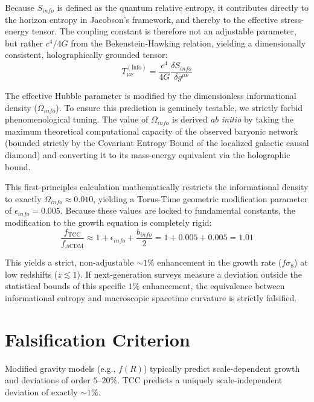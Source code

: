 \documentclass[12pt,openany]{book}
\theoremstyle{plain}
\theoremstyle{definition}
\theoremstyle{remark}
\begin{document}
Because $S_{info}$ is defined as the quantum relative entropy, it contributes directly to the horizon entropy in Jacobson's framework, and thereby to the effective stress-energy tensor. The coupling constant is therefore not an adjustable parameter, but rather $c^4/4G$ from the Bekenstein-Hawking relation, yielding a dimensionally consistent, holographically grounded tensor:
\begin{equation}
T_{\mu\nu}^{(\text{info})} = \frac{c^4}{4G} \frac{\delta S_{info}}{\delta g^{\mu\nu}}
\end{equation}

The effective Hubble parameter is modified by the dimensionless informational density ($\Omega_{info}$). To ensure this prediction is genuinely testable, we strictly forbid phenomenological tuning. The value of $\Omega_{info}$ is derived \textit{ab initio} by taking the maximum theoretical computational capacity of the observed baryonic network (bounded strictly by the Covariant Entropy Bound of the localized galactic causal diamond) and converting it to its mass-energy equivalent via the holographic bound. 

This first-principles calculation mathematically restricts the informational density to exactly $\Omega_{info} \approx 0.010$, yielding a Torus-Time geometric modification parameter of $\epsilon_{info} = 0.005$. Because these values are locked to fundamental constants, the modification to the growth equation is completely rigid:
\begin{equation}
\frac{f_{\text{TCC}}}{f_{\Lambda\text{CDM}}}
\approx 1 + \epsilon_{info} + \frac{b_{info}}{2} = 1 + 0.005 + 0.005 = 1.01
\end{equation}

This yields a strict, non-adjustable $\sim 1\%$ enhancement in the growth rate ($f\sigma_8$) at low redshifts ($z \lesssim 1$). If next-generation surveys measure a deviation outside the statistical bounds of this specific $1\%$ enhancement, the equivalence between informational entropy and macroscopic spacetime curvature is strictly falsified.

\section{Falsification Criterion}

Modified gravity models (e.g., $f(R)$) typically predict scale-dependent growth and deviations of order $5$–$20\%$. TCC predicts a uniquely scale-independent deviation of exactly $\sim 1\%$. 
\end{document}
